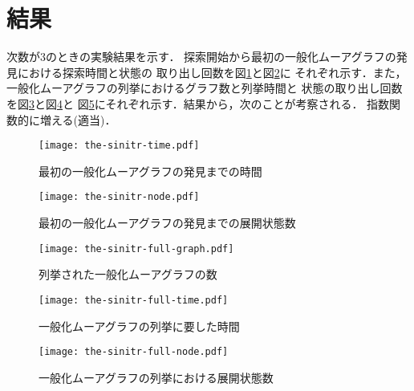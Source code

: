 \section{結果}
次数が3のときの実験結果を示す．
探索開始から最初の一般化ムーアグラフの発見における探索時間と状態の
取り出し回数を図\ref{fig:sinitr-time}と図\ref{fig:sinitr-node}に
それぞれ示す．また，一般化ムーアグラフの列挙におけるグラフ数と列挙時間と
状態の取り出し回数を図\ref{fig:sinitr-full-graph}と図\ref{fig:sinitr-full-time}と
図\ref{fig:sinitr-full-node}にそれぞれ示す．結果から，次のことが考察される．
指数関数的に増える(適当)．

\begin{figure}
  \centering
  \texttt{[image: the-sinitr-time.pdf]}
  \caption{最初の一般化ムーアグラフの発見までの時間}
  \label{fig:sinitr-time}
\end{figure}
\begin{figure}
  \centering
  \texttt{[image: the-sinitr-node.pdf]}
  \caption{最初の一般化ムーアグラフの発見までの展開状態数}
  \label{fig:sinitr-node}
\end{figure}

\begin{figure}
  \centering
  \texttt{[image: the-sinitr-full-graph.pdf]}
  \caption{列挙された一般化ムーアグラフの数}
  \label{fig:sinitr-full-graph}
\end{figure}
\begin{figure}
  \centering
  \texttt{[image: the-sinitr-full-time.pdf]}
  \caption{一般化ムーアグラフの列挙に要した時間}
  \label{fig:sinitr-full-time}
\end{figure}
\begin{figure}
  \centering
  \texttt{[image: the-sinitr-full-node.pdf]}
  \caption{一般化ムーアグラフの列挙における展開状態数}
  \label{fig:sinitr-full-node}
\end{figure}
